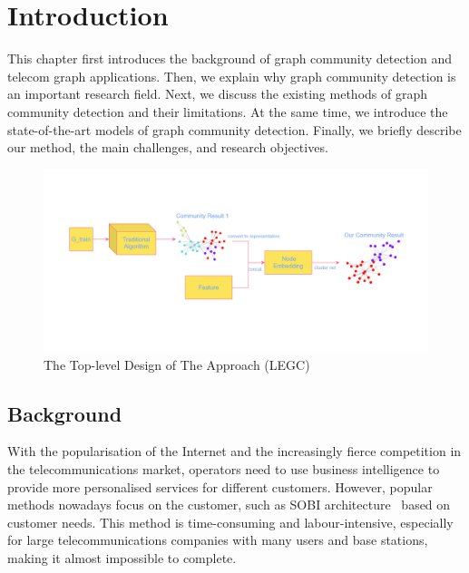 \documentclass[ %
                    author={Tengyao Tu},
                supervisor={Dr. James Pope},
                    degree={MSc},
                     title={A New Perspective on Graph Community Detection: Combining Traditional Methods with Deep Learning Approaches},
                  subtitle={Applying to Telecom Networks and Diverse Datasets},
                      type={},
                      year={2024}]{dissertation}
\begin{document}
\mainmatter


\chapter{Introduction}
\label{chap:introduction}
This chapter first introduces the background of graph community detection and telecom graph applications. Then, we explain why graph community detection is an important research field. Next, we discuss the existing methods of graph community detection and their limitations. At the same time, we introduce the state-of-the-art models of graph community detection. Finally, we briefly describe our method, the main challenges, and research objectives.
\begin{figure}[h!] %
    \centering
    \includegraphics[width=1.0\textwidth]{Figure_2.png} %
    \caption{The Top-level Design of The Approach (LEGC)}
    \label{fig: Our Approach}
\end{figure}

\section{Background}

With the popularisation of the Internet and the increasingly fierce competition in the telecommunications market, operators need to use business intelligence to provide more personalised services for different customers. However, popular methods nowadays focus on the customer, such as SOBI architecture~\cite{ishaya2012service} based on customer needs. This method is time-consuming and labour-intensive, especially for large telecommunications companies with many users and base stations, making it almost impossible to complete.
\end{document}
